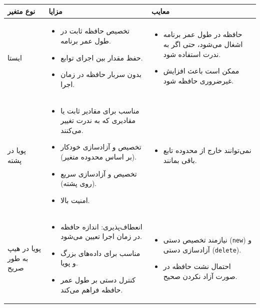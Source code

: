 \documentclass{article}
\begin{document}
\begin{table}[h!]
    \centering
    \begin{tabular}{|p{4cm}|p{6cm}|p{6cm}|}
        \hline
        \textbf{نوع متغیر} & \textbf{مزایا} & \textbf{معایب} \\
        \hline
        ایستا &
        \begin{itemize}
            \item تخصیص حافظه ثابت در طول عمر برنامه.
            \item حفظ مقدار بین اجرای توابع.
            \item بدون سربار حافظه در زمان اجرا.
        \end{itemize} &
        \begin{itemize}
            \item حافظه در طول عمر برنامه اشغال می‌شود، حتی اگر به ندرت استفاده شود.
            \item ممکن است باعث افزایش غیرضروری حافظه شود.
        \end{itemize} \\
        \hline
        پویا در پشته &
        \begin{itemize}
            \item مناسب برای مقادیر ثابت یا مقادیری که به ندرت تغییر می‌کنند.
            \item تخصیص و آزادسازی خودکار (بر اساس محدوده متغیر).
            \item تخصیص و آزادسازی سریع (روی پشته).
            \item امنیت بالا.
        \end{itemize} &
        \begin{itemize}
            \item نمی‌توانند خارج از محدوده تابع باقی بمانند.
        \end{itemize} \\
        \hline
        پویا در هیپ به طور صریح &
        \begin{itemize}
            \item انعطاف‌پذیری: اندازه حافظه در زمان اجرا تعیین می‌شود.
            \item مناسب برای داده‌های بزرگ و پویا.
            \item کنترل دستی بر طول عمر حافظه فراهم می‌کند.
        \end{itemize} &
        \begin{itemize}
            \item نیازمند تخصیص دستی (\texttt{new}) و آزادسازی دستی (\texttt{delete}).
            \item احتمال نشت حافظه در صورت آزاد نکردن صحیح.

\end{itemize}
\end{tabular}
\end{table}
\end{document}
